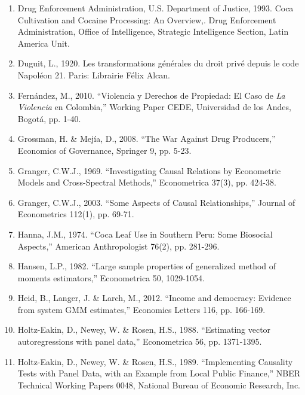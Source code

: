 \begin{enumerate}
\item Drug Enforcement Administration, U.S. Department of Justice, 1993. Coca Cultivation and Cocaine Processing: An Overview,. Drug Enforcement Administration, Office of Intelligence, Strategic Intelligence Section, Latin America Unit.

\item Duguit, L., 1920. Les transformations g\'{e}n\'{e}rales du droit priv\'{e} depuis le code Napol\'{e}on 21. Paris: Librairie Félix Alcan.

\item Fern\'{a}ndez, M., 2010. ``Violencia y Derechos de Propiedad: El Caso de \emph{La Violencia} en Colombia,'' Working Paper CEDE, Universidad de los Andes, Bogot\'{a}, pp. 1-40.

\item Grossman, H. \& Mej\'{i}a, D., 2008. ``The War Against Drug Producers,'' Economics of Governance, Springer 9, pp. 5-23.

\item Granger, C.W.J., 1969. ``Investigating Causal Relations by Econometric Models and Cross-Spectral Methods,'' Econometrica 37(3), pp. 424-38.

\item Granger, C.W.J., 2003. ``Some Aspects of Causal Relationships,'' Journal of Econometrics 112(1), pp. 69-71.

\item Hanna, J.M., 1974. ``Coca Leaf Use in Southern Peru: Some Biosocial Aspects,'' American Anthropologist 76(2), pp. 281-296.

\item Hansen, L.P., 1982. ``Large sample properties of generalized method of moments estimators,'' Econometrica 50, 1029-1054.

\item Heid, B., Langer, J. \& Larch, M., 2012. ``Income and democracy: Evidence from system GMM estimates,'' Economics Letters 116, pp. 166-169.

\item Holtz-Eakin, D., Newey, W. \& Rosen, H.S., 1988. ``Estimating vector autoregressions with panel data,'' Econometrica 56, pp. 1371-1395.

\item Holtz-Eakin, D., Newey, W. \& Rosen, H.S., 1989.
``Implementing Causality Tests with Panel Data, with an Example from Local Public Finance,'' NBER Technical Working Papers 0048, National Bureau of Economic Research, Inc.


\end{enumerate}
